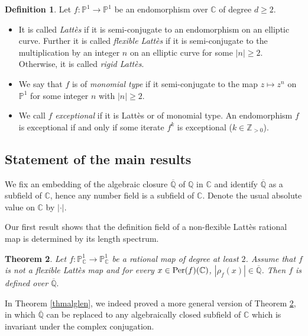 \documentclass[12pt]{amsart}
\theoremstyle{plain}
\newtheorem{Thm}{Theorem}[section]
\theoremstyle{remark}
\theoremstyle{definition}
\newtheorem{Def}[Thm]{Definition}
\def\Z{\mathbb Z}
\def\Q{\mathbb Q}
\def\C{\mathbb C}
\def\P{\mathbb P}
\begin{document}
\begin{Def}
Let $f:\P^1\to \P^1$ be an endomorphism over $\C$ of degree $d\geq 2$. 
\begin{itemize}
\item It is called \emph{Latt\`es} if it is semi-conjugate to an endomorphism on an elliptic curve.
Further it is called \emph{flexible Latt\`es} if it is semi-conjugate to the multiplication by an integer  $n$ on an elliptic curve for some $|n|\geq 2.$ 
Otherwise, it is called \emph{rigid Latt\`es}.
\item We say that $f$ is of \emph{monomial type} if it semi-conjugate to the map $z\mapsto z^n$ on $\P^1$ for some integer $n$ with $|n|\geq 2.$ 
\item We call $f$ \emph{exceptional} if it is Latt\`es or of monomial type. An endomorphism $f$ is exceptional if and only if some iterate  $f^k$ is exceptional ($k\in\Z_{>0}$).
\end{itemize}
 \end{Def}



\subsection{Statement of the main results}
We fix an embedding of the algebraic closure $\overline{\Q}$ of $\Q$ in $\C$ and identify  $\overline{\Q}$ as a subfield of $\C$, hence any number field is a subfield of $\C$. Denote the usual absolute value on $\C$ by $| \cdot |$.




\medskip


Our first result shows that the definition field of a non-flexible Latt\`es rational map is determined by its length spectrum. 
\begin{Thm}\label{thmalglenintro}Let $f: \P_{\C}^1\to \P_{\C}^1$ be a rational map of degree at least $2$.
Assume that  $f$ is not a flexible Latt\`es map and  for every $x\in {\rm Per}(f)(\C)$, $|\rho_f(x)|\in \overline{\Q}$. Then $f$ is defined over $\overline{\Q}.$
\end{Thm}
In Theorem \ref{thmalglen}, we indeed proved a more general version of Theorem \ref{thmalglenintro}, in which $\overline{\Q}$ can be replaced to any algebraically closed subfield of $\C$ which is invariant under the complex conjugation. 

\medskip
\end{document}
